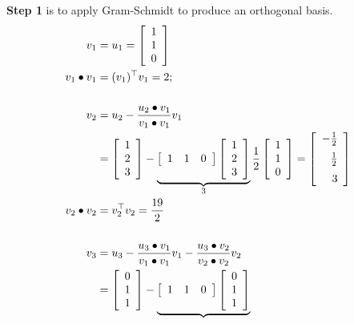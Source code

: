 \textbf{Step 1} is to apply Gram-Schmidt to produce an orthogonal basis.
	\begin{align*}
		v_1 &= u_1 = \left[ \begin{array}{c} 1 \\ 1 \\ 0 \end{array} \right]\\
		v_1 \bullet v_1 &= (v_1)^\top v_1 = 2 ;\\
		\\
		v_2	&= u_2 - \frac{u_2 \bullet v_1}{v_1 \bullet v_1} v_1 \\
		&= \left[ \begin{array}{c} 1 \\ 2 \\ 3 \end{array} \right]
		- \underbrace{%
		   \left[ \begin{array}{ccc} 1 & 1 & 0 \end{array} \right]
		   \left[ \begin{array}{c} 1 \\ 2 \\ 3 \end{array} \right]%
		   }_{3}
		\frac{1}{2}
		   \left[ \begin{array}{c} 1 \\ 1 \\ 0 \end{array} \right]
		= \left[ \begin{array}{r}
			- \frac{1}{2} \medskip \\ \frac{1}{2} \medskip \\ 3
			\end{array} \right] \\
		v_2 \bullet v_2 &= v_2^\top v_2  = \frac{19}{2} \\
		\\
		v_3	&= u_3 - \frac{u_3 \bullet v_1}{v_1 \bullet v_1} v_1
			- \frac{u_3 \bullet v_2}{v_2 \bullet v_2} v_2 \\
		&= \left[ \begin{array}{c} 0 \\ 1 \\ 1 \end{array} \right]
		- \underbrace{%
		   \left[ \begin{array}{ccc} 1 & 1 & 0 \end{array} \right]
		   \left[ \begin{array}{c} 0 \\ 1 \\ 1 \end{array} \right]%
}
\end{align*}
